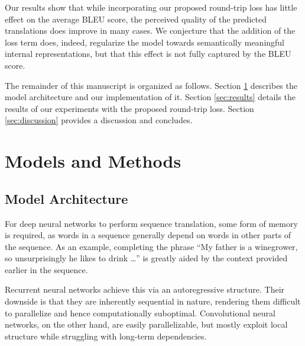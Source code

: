 \documentclass[10pt,a4paper]{article}
\begin{document}
Our results show that while incorporating our proposed round-trip loss has little effect on the average BLEU score, the perceived quality of the predicted translations does improve in many cases. We conjecture that the addition of the loss term does, indeed, regularize the model towards semantically meaningful internal representations, but that this effect is not fully captured by the BLEU score.

The remainder of this manuscript is organized as follows. Section \ref{sec:models} describes the model architecture and our implementation of it. Section \ref{sec:results} details the results of our experiments with the proposed round-trip loss. Section \ref{sec:discussion} provides a discussion and concludes.

\section{Models and Methods}\label{sec:models}
\subsection{Model Architecture}
For deep neural networks to perform sequence translation, some form of memory is required, as words in a sequence generally depend on words in other parts of the sequence. As an example, completing  the phrase ``My father is a winegrower, so unsurprisingly he likes to drink \ldots'' is greatly aided by the context provided earlier in the sequence.

Recurrent neural networks achieve this via an autoregressive structure. Their downside is that they are inherently sequential in nature, rendering them difficult to parallelize and hence computationally suboptimal.
Convolutional neural networks, on the other hand, are easily parallelizable, but mostly exploit local structure while struggling with long-term dependencies. 
\end{document}
